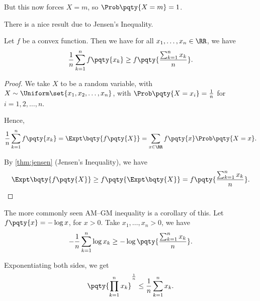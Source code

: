 But this now forces \(X = m\), so \(\Prob\pqty{X = m} = 1\).

There is a nice result due to Jensen's Inequality.

\begin{theorem}[AM--GM Inequality]
    \label{thm:am-gm}
    Let \(f\) be a convex function. Then we have for all \(x_1, \ldots, x_n \in \RR\), we have
    \[
        \frac{1}{n} \sum_{k = 1}^{n} f\pqty{x_k} \geq f\pqty{\frac{\sum_{k = 1}^{n} x_k}{n}}.
    \]
\end{theorem}

\begin{proof}
    We take \(X\) to be a random variable, with \(X \sim \Uniform \set{x_1, x_2, \ldots, x_n}\), with \(\Prob\pqty{X = x_i} = \frac{1}{n}\) for \(i = 1, 2, \ldots, n\).

    Hence,
    \[
        \frac{1}{n} \sum_{k = 1}^{n} f\pqty{x_k} = \Expt\bqty{f\pqty{X}} = \sum_{x \in \RR} f\pqty{x} \Prob\pqty{X = x}.
    \]

    By \autoref{thm:jensen} (Jensen's Inequality), we have
    \[
        \Expt\bqty{f\pqty{X}} \geq f\pqty{\Expt\bqty{X}} = f\pqty{\frac{\sum_{k = 1}^{n} x_k}{n}}.
    \]
\end{proof}

\begin{remark}
    The more commonly seen AM--GM inequality is a corollary of this. Let \(f\pqty{x} = - \log x\), for \(x > 0\). Take \(x_1, \ldots, x_n > 0\), we have
    \[
        - \frac{1}{n} \sum_{k = 1}^{n} \log x_k \geq - \log \pqty{\frac{\sum_{k = 1}^{n} x_k}{n}}.
    \]

    Exponentiating both sides, we get
    \[
        \pqty{\prod_{k = 1}^{n} x_k}^{\frac{1}{n}} \leq \frac{1}{n} \sum_{k = 1}^{n} x_k.
    \]
\end{remark}